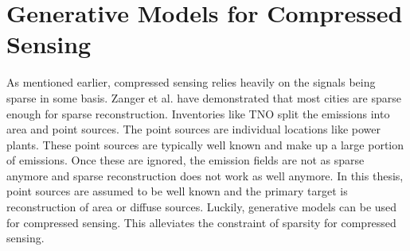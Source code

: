 




\section{Generative Models for Compressed Sensing}
As mentioned earlier, compressed sensing relies heavily on the signals being sparse in some basis.
Zanger et al. have demonstrated that most cities are sparse enough for sparse reconstruction.
Inventories like TNO split the emissions into area and point sources.
The point sources are individual locations like power plants.
These point sources are typically well known and make up a large portion of emissions.
Once these are ignored, the emission fields are not as sparse anymore and sparse reconstruction does not work as well anymore.
In this thesis, point sources are assumed to be well known and the primary target is reconstruction of area or diffuse sources.
Luckily, generative models can be used for compressed sensing.
This alleviates the constraint of sparsity for compressed sensing.

